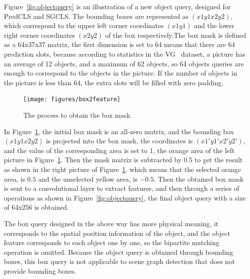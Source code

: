 Figure~\ref{fig:objectquery} is an illustration of a new object query, designed for PredCLS and SGCLS. The bounding boxes are represented as $ (x1y1x2y2) $, which correspond to the upper left corner coordinates $ (x1y1) $ and the lower right corner coordinates $(x2y2)$ of the box respectively.The box mask is defined as a 64x37x37 matrix, the first dimension is set to 64 means that there are 64 prediction slots, because according to statistics in the VG~\cite{krishna2017visual} dataset, a picture has an average of 12 objects, and a maximum of 62 objects, so 64 objects queries are enough to correspond to the objects in the picture. If the number of objects in the picture is less than 64, the extra slots will be filled with zero padding.

\begin{figure}[H]
	\centering
	\texttt{[image: figures/box2feature]}
	\caption[The process to obtain the box mask]{The process to obtain the box mask.}
	\label{fig:box2feature}
\end{figure}
In Figure~\ref{fig:box2feature}, the initial box mask is an all-zero matrix, and the bounding box $ (x1y1x2y2) $ is projected into the box mask, the coordinates is $ (x1'y1'x2'y2') $, and the value of the corresponding area is set to 1, the orange area of the left picture in Figure~\ref{fig:box2feature}. Then the mask matrix is subtracted by 0.5 to get the result as shown in the right picture of Figure~\ref{fig:box2feature}. which means that the selected orange area, is $ 0.5 $ and the unselected yellow area, is $ -0.5 $. Then the obtained box mask is sent to a convolutional layer to extract features, and then through a series of operations as shown in Figure~\ref{fig:objectquery}, the final object query with a size of 64x256 is obtained.

The box query designed in the above way has more physical meaning, it corresponds to the spatial position information of the object, and the object feature corresponds to each object one by one, so the bipartite matching operation is omitted.  Because the object query is obtained through bounding boxes, this box query is not applicable to scene graph detection that does not provide bounding boxes.

